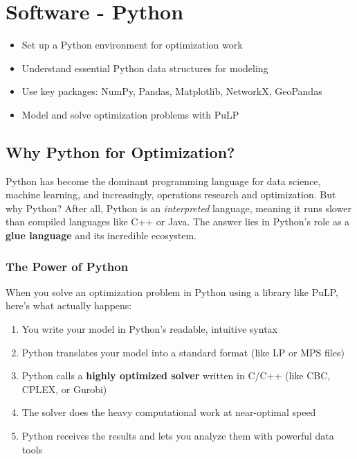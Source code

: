 \chapter{Software - Python}
\label{ch:software-python}

\begin{outcome}
\begin{itemize}
\item Set up a Python environment for optimization work
\item Understand essential Python data structures for modeling
\item Use key packages: NumPy, Pandas, Matplotlib, NetworkX, GeoPandas
\item Model and solve optimization problems with PuLP
\end{itemize}
\end{outcome}

\section{Why Python for Optimization?}

Python has become the dominant programming language for data science, machine learning, and increasingly, operations research and optimization. But why Python? After all, Python is an \emph{interpreted} language, meaning it runs slower than compiled languages like C++ or Java. The answer lies in Python's role as a \textbf{glue language} and its incredible ecosystem.

\subsection{The Power of Python}

When you solve an optimization problem in Python using a library like PuLP, here's what actually happens:

\begin{enumerate}
\item You write your model in Python's readable, intuitive syntax
\item Python translates your model into a standard format (like LP or MPS files)
\item Python calls a \textbf{highly optimized solver} written in C/C++ (like CBC, CPLEX, or Gurobi)
\item The solver does the heavy computational work at near-optimal speed
\item Python receives the results and lets you analyze them with powerful data tools
\end{enumerate}

